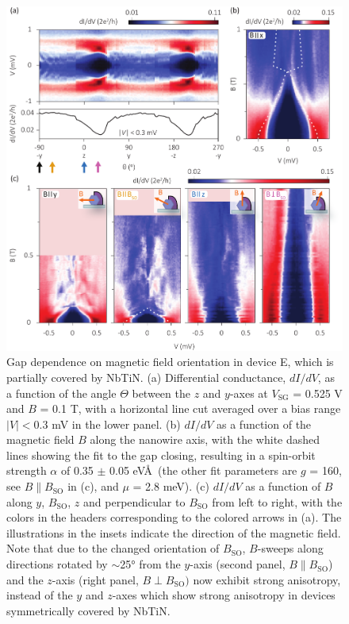 \begin{figure}
\begin{center}
\centering
\includegraphics[width=0.7\columnwidth]{chapter_spinorbit/figures/SFig6_Bsweeps_half.pdf}
\caption{\label{fig:BsweepsHalf}
Gap dependence on magnetic field orientation in device E, which is partially covered by NbTiN.
(a) Differential conductance, $dI/dV$, as a function of the angle $\Theta$ between the $z$ and $y$-axes at $V_{\mathrm{SG}}$ = 0.525 V and $B$ = 0.1 T, with a horizontal line cut averaged over a bias range $|V| < 0.3$ mV in the lower panel.
(b) $dI/dV$ as a function of the magnetic field $B$ along the nanowire axis, with the white dashed lines showing the fit to the gap closing, resulting in a spin-orbit strength $\alpha$ of 0.35 $\pm$ 0.05 eV\AA\ (the other fit parameters are $g$ = 160, see $B \parallel B_{\mathrm{SO}}$ in (c), and $\mu$ = 2.8 meV).
(c) $dI/dV$ as a function of $B$ along $y$, $B_{\mathrm{SO}}$, $z$ and perpendicular to $B_{\mathrm{SO}}$ from left to right, with the colors in the headers corresponding to the colored arrows in (a).
The illustrations in the insets indicate the direction of the magnetic field.
Note that due to the changed orientation of $B_{\mathrm{SO}}$, $B$-sweeps along directions rotated by $\sim$\ang{25} from the $y$-axis (second panel, $B \parallel B_{\mathrm{SO}}$) and the $z$-axis (right panel, $B \perp B_{\mathrm{SO}})$  now exhibit strong anisotropy, instead of the $y$ and $z$-axes which show strong anisotropy in devices symmetrically covered by NbTiN.
}
\end{center}
\end{figure}

